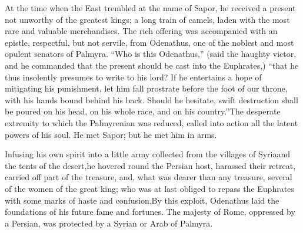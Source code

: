




At the time when the East trembled at the name of Sapor, he
received a present not unworthy of the greatest kings; a long
train of camels, laden with the most rare and valuable
merchandises. The rich offering was accompanied with an epistle,
respectful, but not servile, from Odenathus, one of the noblest
and most opulent senators of Palmyra. “Who is this Odenathus,”
(said the haughty victor, and he commanded that the present
should be cast into the Euphrates,) “that he thus insolently
presumes to write to his lord? If he entertains a hope of
mitigating his punishment, let him fall prostrate before the foot
of our throne, with his hands bound behind his back. Should he
hesitate, swift destruction shall be poured on his head, on his
whole race, and on his country.”\footnotemark[146] The desperate extremity to
which the Palmyrenian was reduced, called into action all the
latent powers of his soul. He met Sapor; but he met him in arms.

Infusing his own spirit into a little army collected from the
villages of Syria\footnotemark[147] and the tents of the desert,\footnotemark[148] he hovered
round the Persian host, harassed their retreat, carried off part
of the treasure, and, what was dearer than any treasure, several
of the women of the great king; who was at last obliged to repass
the Euphrates with some marks of haste and confusion.\footnotemark[149] By this
exploit, Odenathus laid the foundations of his future fame and
fortunes. The majesty of Rome, oppressed by a Persian, was
protected by a Syrian or Arab of Palmyra.

